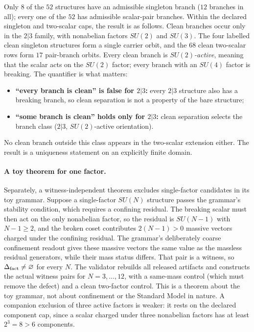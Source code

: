 Only \(8\) of the \(52\) structures have an admissible singleton branch (\(12\) branches in all); every one of the
\(52\) has admissible scalar-pair branches. Within the declared singleton and two-scalar caps, the result is as
follows. Clean branches occur only in the \(2|3\)
family, with nonabelian factors \(SU(2)\) and \(SU(3)\). The four labelled clean singleton structures form a single
carrier orbit, and the \(68\) clean two-scalar rows form \(17\) pair-branch orbits. Every clean branch is
\emph{\(SU(2)\)-active}, meaning that the scalar acts on the \(SU(2)\) factor; every branch with an \(SU(4)\) factor
is breaking. The quantifier is what matters:

\begin{itemize}\tightlist
\item \textbf{``every branch is clean'' is false for \(2|3\):} every \(2|3\) structure also has a breaking branch, so
  clean separation is not a property of the bare structure;
\item \textbf{``some branch is clean'' holds only for \(2|3\):} clean separation selects the branch class
  (\(2|3\), \(SU(2)\)-active orientation).
\end{itemize}

No clean branch outside this class appears in the two-scalar extension either. The result is a uniqueness statement
on an explicitly finite domain.

\paragraph{A toy theorem for one factor.} Separately, a witness-independent theorem excludes single-factor
candidates in its toy grammar. Suppose a single-factor \(SU(N)\) structure passes the grammar's stability condition,
which requires a confining residual. The breaking scalar must then act on the only nonabelian factor, so the residual is
\(SU(N-1)\) with \(N-1\ge2\), and the broken coset contributes \(2(N-1)>0\) massive vectors charged under the
confining residual. The grammar's deliberately coarse confinement readout gives these massive vectors the same value
as the massless residual generators, while their mass status differs. That pair is a witness, so
\(\Delta_{\mathrm{fact}}\neq\varnothing\) for every \(N\). The validator rebuilds all released artifacts and constructs the actual
witness pairs for \(N=3,\dots,12\), with a same-mass control (which must remove the defect) and a clean two-factor
control. This is a theorem about the toy grammar, not about confinement or the Standard Model in nature. A companion
exclusion of three active factors is weaker: it rests on the declared component cap, since a scalar charged under three
nonabelian factors has at least \(2^3=8>6\) components.

